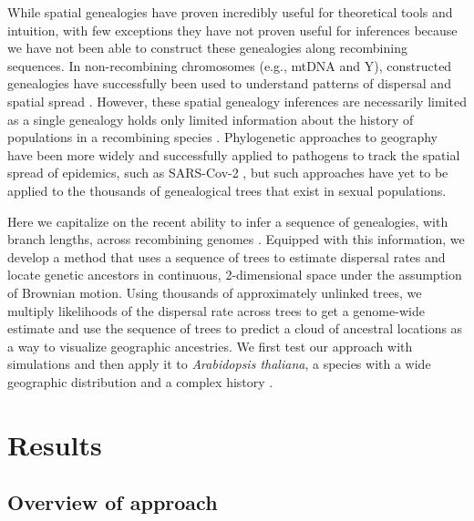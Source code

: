 \documentclass[12pt]{article}
\begin{document}
While spatial genealogies have proven incredibly useful for theoretical tools and intuition, with few exceptions they have not proven useful for inferences because we have not been able to construct these genealogies along recombining sequences. In non-recombining chromosomes (e.g., mtDNA and Y), constructed genealogies have successfully been used to understand patterns of dispersal and spatial spread \citep{avise2009phylogeography}. However, these spatial genealogy inferences are necessarily limited as a single genealogy holds only limited information about the history of populations in a recombining species \citep{barton1995genealogies}. Phylogenetic approaches to geography \citep[`phylogeography';][]{knowles2009statistical} have been more widely and successfully applied to pathogens to track the spatial spread of epidemics, such as SARS-Cov-2 \citep{martin2021insights}, but such approaches have yet to be applied to the thousands of genealogical trees that exist in sexual populations. 

Here we capitalize on the recent ability to infer a sequence of genealogies, with branch lengths, across recombining genomes \citep{rasmussen2014genome,speidel2019method,wohns2021unified}. Equipped with this information, we develop a method that uses a sequence of trees to estimate dispersal rates and locate genetic ancestors in continuous, 2-dimensional space under the assumption of Brownian motion. Using thousands of approximately unlinked trees, we multiply likelihoods of the dispersal rate across trees to get a genome-wide estimate and use the sequence of trees to predict a cloud of ancestral locations as a way to visualize geographic ancestries. We first test our approach with simulations and then apply it to \textit{Arabidopsis thaliana}, a species with a wide geographic distribution and a complex history \citep{fulgione2018archaic}.

\section*{Results}

\subsection*{Overview of approach} 
\end{document}
